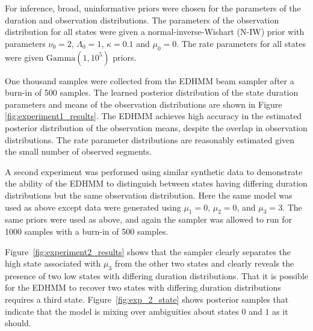 For inference, broad, uninformative priors were chosen for the parameters of the duration and observation distributions. The parameters of the observation distribution for all states were given a normal-inverse-Wishart (N-IW) prior with parameters $\nu_0 = 2$, $\Lambda_0 = 1$, $\kappa=0.1$ and $\mu_0 = 0$. The rate parameters for all states were given $\mathrm{Gamma}(1, 10^{5})$ priors. 

One thousand samples were collected from the EDHMM beam sampler after a burn-in of 500 samples. The learned posterior distribution of the state duration parameters and means of the observation distributions are shown in Figure \ref{fig:experiment1_results}.  The EDHMM achieves high accuracy in the estimated posterior distribution of the observation means, despite the overlap in observation distributions. The rate parameter distributions are reasonably estimated given the small number of observed segments.

A second experiment was performed using similar synthetic data to demonstrate the ability of the EDHMM to distinguish between states having differing duration distributions but the same observation distribution. Here the same model was used as above except data 
were
generated using $\mu_1 = 0$, $\mu_2 = 0$, and $\mu_3 = 3$. The same priors were used as above, and again the sampler was allowed to run for 1000 samples with a burn-in of 500 samples.

Figure~\ref{fig:experiment2_results} shows that the sampler clearly separates the high state associated with $\mu_3$ from the other two states and clearly 
reveals the presence of
two  low states with differing duration distributions.   That it is possible for the EDHMM to recover two states with differing duration distributions requires a third state.  Figure~\ref{fig:exp_2_state} shows posterior samples that indicate that the model is mixing over ambiguities about states $0$ and $1$ as it should. %


